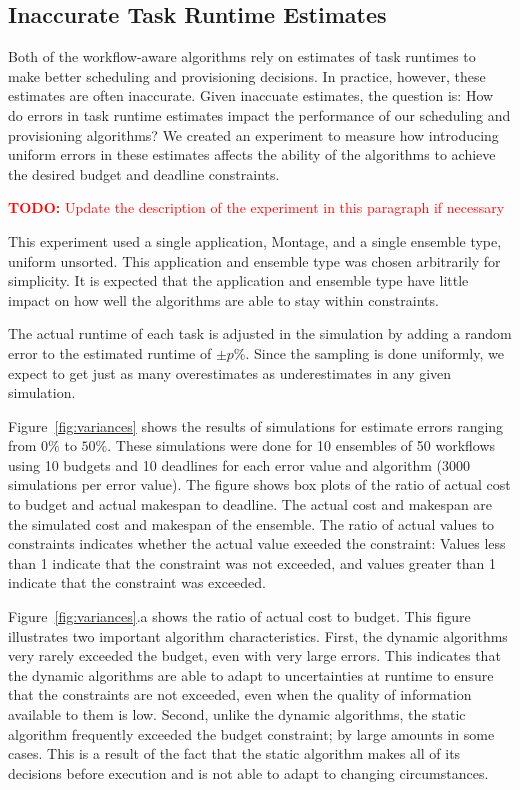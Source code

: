 \documentclass[conference]{IEEEtran}
\newcommand{\TODO}[1]{
  {\Large \textcolor{red}{\textbf{TODO: }#1}}
}
\begin{document}
\subsection{Inaccurate Task Runtime Estimates}
\label{sec:variances}

Both of the workflow-aware algorithms rely on estimates of task runtimes to
make better scheduling and provisioning decisions. In practice, however, these
estimates are often inaccurate. Given inaccuate estimates, the question is:
How do errors in task runtime estimates impact the performance of our
scheduling and provisioning algorithms? We created an experiment to measure
how introducing uniform errors in these estimates affects the ability of the
algorithms to achieve the desired budget and deadline constraints. 

\TODO{Update the description of the experiment in this paragraph if necessary}

This experiment used a single application, Montage, and a single ensemble
type, uniform unsorted. This application and ensemble type was chosen
arbitrarily for simplicity. It is expected that the application and ensemble
type have little impact on how well the algorithms are able to stay within
constraints.

The actual runtime of each task is adjusted in the simulation by adding a
random error to the estimated runtime of $\pm p\%$. Since the sampling is done
uniformly, we expect to get just as many overestimates as underestimates in
any given simulation.

Figure~\ref{fig:variances} shows the results of simulations for estimate
errors ranging from $0\%$ to $50\%$. These simulations were done for 10
ensembles of 50 workflows using 10 budgets and 10 deadlines for each error
value and algorithm (3000 simulations per error value). The figure shows box
plots of the ratio of actual cost to budget and actual makespan to deadline.
The actual cost and makespan are the simulated cost and makespan of the
ensemble. The ratio of actual values to constraints indicates whether the
actual value exeeded the constraint: Values less than 1 indicate that the
constraint was not exceeded, and values greater than 1 indicate that the
constraint was exceeded.

Figure~\ref{fig:variances}.a shows the ratio of actual cost to budget. This
figure illustrates two important algorithm characteristics. First, the dynamic
algorithms very rarely exceeded the budget, even with very large errors. This
indicates that the dynamic algorithms are able to adapt to uncertainties at
runtime to ensure that the constraints are not exceeded, even when the quality
of information available to them is low. Second, unlike the dynamic
algorithms, the static algorithm frequently exceeded the budget constraint; by
large amounts in some cases. This is a result of the fact that the static
algorithm makes all of its decisions before execution and is not able to adapt
to changing circumstances.
\end{document}
